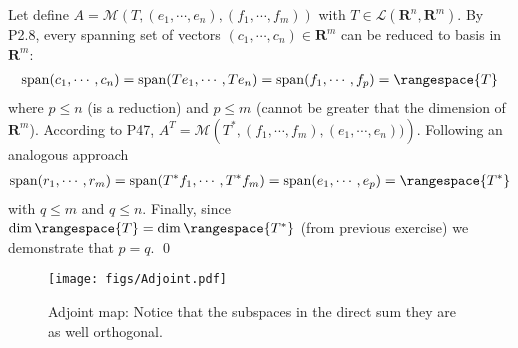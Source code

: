 Let define $A = \mathcal{M}\left(T, (e_1,\cdots, e_n), (f_1,\cdots, f_m)\right)$ with $T\in\mathcal{L}(\mathbf{R}^n, \mathbf{R}^m)$. By P2.8, every spanning set of vectors $(c_1,\cdots,c_n)\in\mathbf{R}^m$ can be reduced to basis in $\mathbf{R}^m$:
\begin{align*}
\mathrm{span}(c_1,\cdots,c_n) = \mathrm{span}(Te_1,\cdots,Te_n) =  \mathrm{span}(f_1,\cdots,f_p) = \rangespace{T}
\end{align*}
where $p\leq n$ (is a reduction) and $p\leq m$ (cannot be greater that the dimension of $\mathbf{R}^m$). 
According to P47, $A^T = \mathcal{M}\left(T^*, (f_1,\cdots, f_m), (e_1,\cdots, e_n))\right)$. Following an analogous approach
\begin{align*}
\mathrm{span}(r_1,\cdots,r_m) = \mathrm{span}(T^*f_1,\cdots,T^*f_m) =  \mathrm{span}(e_1,\cdots,e_p) = \rangespace{T^*}
\end{align*}
with $q\leq m$ and $q\leq n$. Finally, since $\dim{\rangespace{T}} = \dim{\rangespace{T^*}}$ (from previous exercise) we demonstrate that $p = q$. \qed

\begin{figure}[htbp!]
\label{fig:adjoint_map}
\centering
\texttt{[image: figs/Adjoint.pdf]}
\caption{Adjoint map: Notice that the subspaces in the direct sum they are as well orthogonal.} 
\end{figure}


